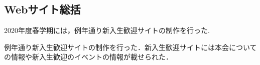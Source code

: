\subsection*{Webサイト総括}


2020年度春学期には，例年通り新入生歓迎サイトの制作を行った.

例年通り新入生歓迎サイトの制作を行った．新入生歓迎サイトには本会についての情報や新入生歓迎のイベントの情報が載せられた．
